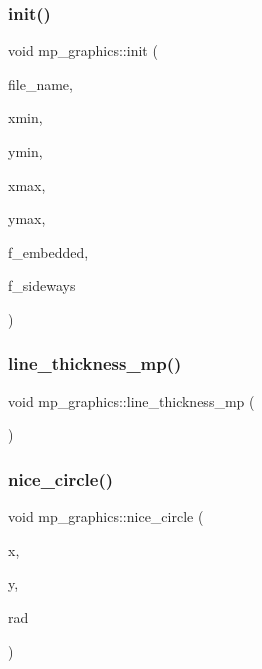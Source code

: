 \subsubsection{\texorpdfstring{init()}{init()}}
{\footnotesize\ttfamily void mp\+\_\+graphics\+::init (\begin{DoxyParamCaption}\item[{const char $\ast$}]{file\+\_\+name,  }\item[{\mbox{\hyperlink{galois_8h_a09fddde158a3a20bd2dcadb609de11dc}{I\+NT}}}]{xmin,  }\item[{\mbox{\hyperlink{galois_8h_a09fddde158a3a20bd2dcadb609de11dc}{I\+NT}}}]{ymin,  }\item[{\mbox{\hyperlink{galois_8h_a09fddde158a3a20bd2dcadb609de11dc}{I\+NT}}}]{xmax,  }\item[{\mbox{\hyperlink{galois_8h_a09fddde158a3a20bd2dcadb609de11dc}{I\+NT}}}]{ymax,  }\item[{\mbox{\hyperlink{galois_8h_a09fddde158a3a20bd2dcadb609de11dc}{I\+NT}}}]{f\+\_\+embedded,  }\item[{\mbox{\hyperlink{galois_8h_a09fddde158a3a20bd2dcadb609de11dc}{I\+NT}}}]{f\+\_\+sideways }\end{DoxyParamCaption})}

\mbox{\label{classmp__graphics_ada686670b0e5c358f58c30b554822010}} 
\subsubsection{\texorpdfstring{line\+\_\+thickness\+\_\+mp()}{line\_thickness\_mp()}}
{\footnotesize\ttfamily void mp\+\_\+graphics\+::line\+\_\+thickness\+\_\+mp (\begin{DoxyParamCaption}{ }\end{DoxyParamCaption})}

\mbox{\label{classmp__graphics_a29055ee6a26b527757614c4e75911ade}} 
\subsubsection{\texorpdfstring{nice\+\_\+circle()}{nice\_circle()}}
{\footnotesize\ttfamily void mp\+\_\+graphics\+::nice\+\_\+circle (\begin{DoxyParamCaption}\item[{\mbox{\hyperlink{galois_8h_a09fddde158a3a20bd2dcadb609de11dc}{I\+NT}}}]{x,  }\item[{\mbox{\hyperlink{galois_8h_a09fddde158a3a20bd2dcadb609de11dc}{I\+NT}}}]{y,  }\item[{\mbox{\hyperlink{galois_8h_a09fddde158a3a20bd2dcadb609de11dc}{I\+NT}}}]{rad }\end{DoxyParamCaption})}

